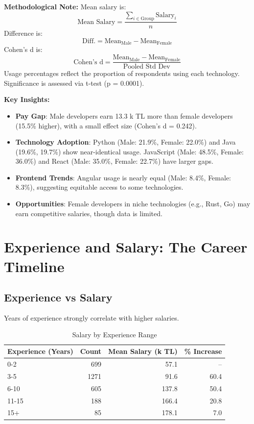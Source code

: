 \documentclass[12pt,a4paper]{article}
\begin{document}
\textbf{Methodological Note:}
Mean salary is:
\[
	\text{Mean Salary} = \frac{\sum_{i \in \text{Group}} \text{Salary}_i}{n}
\]
Difference is:
\[
	\text{Diff.} = \text{Mean}_{\text{Male}} - \text{Mean}_{\text{Female}}
\]
Cohen’s d is:
\[
	\text{Cohen’s d} = \frac{\text{Mean}_{\text{Male}} - \text{Mean}_{\text{Female}}}{\text{Pooled Std Dev}}
\]
Usage percentages reflect the proportion of respondents using each technology. Significance is assessed via t-test (p = 0.0001).

\textbf{Key Insights:}
\begin{itemize}
	\item \textbf{Pay Gap}: Male developers earn 13.3 k TL more than female developers (15.5\% higher), with a small effect size (Cohen’s d = 0.242).
	\item \textbf{Technology Adoption}: Python (Male: 21.9\%, Female: 22.0\%) and Java (19.6\%, 19.7\%) show near-identical usage. JavaScript (Male: 48.5\%, Female: 36.0\%) and React (Male: 35.0\%, Female: 22.7\%) have larger gaps.
	\item \textbf{Frontend Trends}: Angular usage is nearly equal (Male: 8.4\%, Female: 8.3\%), suggesting equitable access to some technologies.
	\item \textbf{Opportunities}: Female developers in niche technologies (e.g., Rust, Go) may earn competitive salaries, though data is limited.
\end{itemize}

\section{Experience and Salary: The Career Timeline}

\subsection{Experience vs Salary}
Years of experience strongly correlate with higher salaries.

\begin{table}[H]
	\centering
	\small
	\begin{tabular}{lrrr}
		\toprule
		\textbf{Experience (Years)} & \textbf{Count} & \textbf{Mean Salary (k TL)} & \textbf{\% Increase} \\
		\midrule
		0-2                         & 699            & 57.1                        & --                   \\
		3-5                         & 1271           & 91.6                        & 60.4                 \\
		6-10                        & 605            & 137.8                       & 50.4                 \\
		11-15                       & 188            & 166.4                       & 20.8                 \\
		15+                         & 85             & 178.1                       & 7.0                  \\
		\bottomrule
	\end{tabular}
	\caption{Salary by Experience Range}
\end{table}
\end{document}
